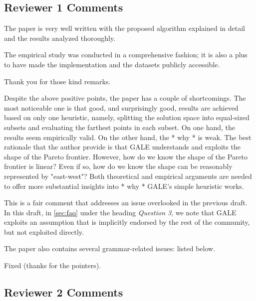 \documentclass[10pt,journal,compsoc]{IEEEtran}
\newcommand{\tion}[1]{\textsection\ref{sec:#1}}
\newenvironment{changed}{\par\color{MyDarkBlue}}{\par}
\begin{document}
\subsection{Reviewer 1 Comments}

The paper is very well written with the proposed algorithm explained in detail and the results analyzed thoroughly.

The empirical study was conducted in a comprehensive fashion; it is also a plus to have made the implementation and the datasets publicly accessible.
\begin{changed}

Thank you for those kind remarks.
\end{changed}
Despite the above positive points, the paper has a
couple of shortcomings. The most noticeable one is
that good, and surprisingly good, results are
achieved based on only one heuristic, namely,
splitting the solution space into equal-sized
subsets and evaluating the farthest points in each
subset. On one hand, the results seem empirically
valid. On the other hand, the * why * is weak. The
best rationale that the author provide is that GALE
understands and exploits the shape of the Pareto
frontier. However, how do we know the shape of the
Pareto frontier is linear? Even if so, how do we
know the shape can be reasonably represented by
"east-west"? Both theoretical and empirical
arguments are needed to offer more substantial
insights into * why * GALE's simple heuristic works.

\begin{changed}
This is a fair comment that addresses an issue
overlooked in the previous draft. In this draft, in
\tion{faq} under the heading {\em Question 3}, we
note that GALE exploits an assumption that is
implicitly endorsed by the rest of the community,
but not exploited directly.
\end{changed}


The paper also contains several grammar-related issues: listed below.

\begin{changed}
Fixed (thanks for the pointers).
\end{changed}

\subsection{Reviewer 2 Comments}
\end{document}
